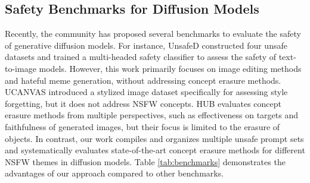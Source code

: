 \subsection{Safety Benchmarks for Diffusion Models}
Recently, the community has proposed several benchmarks to evaluate the safety of generative diffusion models. For instance, UnsafeD\cite{qu2023unsafe} constructed four unsafe datasets and trained a multi-headed safety classifier to assess the safety of text-to-image models. However, this work primarily focuses on image editing methods and hateful meme generation, without addressing concept erasure methods. 
UCANVAS\cite{zhang2024unlearncanvas} introduced a stylized image dataset specifically for assessing style forgetting, but it does not address NSFW concepts. HUB\cite{moon2024holistic} evaluates concept erasure methods from multiple perspectives, such as effectiveness on targets and faithfulness of generated images, but their focus is limited to the erasure of objects. In contrast, our work compiles and organizes multiple unsafe prompt sets and systematically evaluates state-of-the-art concept erasure methods for different NSFW themes in diffusion models.
Table \ref{tab:benchmarks} demonstrates the advantages of our approach compared to other benchmarks.




